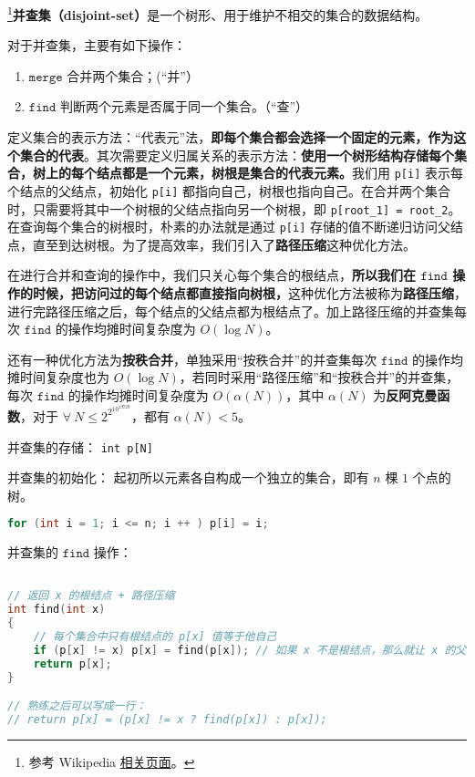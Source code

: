 
\footnote{参考 Wikipedia \href{https://en.wikipedia.org/wiki/Disjoint-set_data_structure}{相关页面}。}\textbf{并查集（disjoint-set）}是一个树形、用于维护不相交的集合的数据结构。

对于并查集，主要有如下操作：
\begin{enumerate}
\item $\mathtt{merge}$ 合并两个集合；(“并”）

\item $\mathtt{find}$ 判断两个元素是否属于同一个集合。（“查”）
\end{enumerate}

定义集合的表示方法：“代表元”法，\textbf{即每个集合都会选择一个固定的元素，作为这个集合的代表}。其次需要定义归属关系的表示方法：\textbf{使用一个树形结构存储每个集合，树上的每个结点都是一个元素，树根是集合的代表元素。}我们用 \verb|p[i]| 表示每个结点的父结点，初始化 \verb|p[i]| 都指向自己，树根也指向自己。在合并两个集合时，只需要将其中一个树根的父结点指向另一个树根，即 \verb|p[root_1] = root_2|。在查询每个集合的树根时，朴素的办法就是通过 \verb|p[i]| 存储的值不断递归访问父结点，直至到达树根。为了提高效率，我们引入了\textbf{路径压缩}这种优化方法。

在进行合并和查询的操作中，我们只关心每个集合的根结点，\textbf{所以我们在 $\mathtt{find}$ 操作的时候，把访问过的每个结点都直接指向树根，}这种优化方法被称为\textbf{路径压缩}，进行完路径压缩之后，每个结点的父结点都为根结点了。加上路径压缩的并查集每次 $\mathtt{find}$ 的操作均摊时间复杂度为 $O(\log N)$。

还有一种优化方法为\textbf{按秩合并}，单独采用“按秩合并”的并查集每次 $\mathtt{find}$ 的操作均摊时间复杂度也为 $O(\log N)$，若同时采用“路径压缩”和“按秩合并”的并查集，每次 $\mathtt{find}$ 的操作均摊时间复杂度为 $O(\alpha(N))$，其中 $\alpha(N)$ 为\textbf{反阿克曼函数}，对于 $\forall \ N \leq 2^{2^{10^{19729}}}$，都有 $\alpha(N) < 5$。

并查集的存储：
\verb|int p[N]|

并查集的初始化：
起初所以元素各自构成一个独立的集合，即有 $n$ 棵 $1$ 个点的树。
\begin{lstlisting}[language=cpp]
for (int i = 1; i <= n; i ++ ) p[i] = i;
\end{lstlisting}

并查集的 $\mathtt{find}$ 操作：
\begin{lstlisting}[language=cpp]

// 返回 x 的根结点 + 路径压缩
int find(int x)
{
    // 每个集合中只有根结点的 p[x] 值等于他自己
    if (p[x] != x) p[x] = find(p[x]); // 如果 x 不是根结点，那么就让 x 的父结点直接等于根结点
    return p[x];
}

// 熟练之后可以写成一行：
// return p[x] = (p[x] != x ? find(p[x]) : p[x]);
\end{lstlisting}

